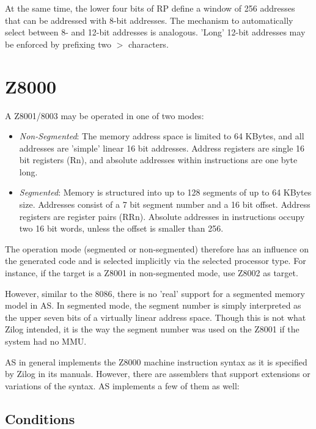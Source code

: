 \documentclass[12pt,twoside]{report}
\begin{document}
At the same time, the lower four bits of RP define a window of 256
addresses that can be addressed with 8-bit addresses.  The mechanism
to automatically select between 8- and 12-bit addresses is analogous.
'Long' 12-bit addresses may be enforced by prefixing two $>$
characters.


\section{Z8000}
\label{Z8000Spec}

A Z8001/8003 may be operated in one of two modes:

\begin{itemize}
\item{{\em Non-Segmented}: The memory address space is limited to 64 KBytes,
      and all addresses are 'simple' linear 16 bit addresses.  Address
      registers are single 16 bit registers (Rn), and absolute addresses
      within instructions are one byte long.}
\item{{\em Segmented}: Memory is structured into up to 128 segments of up
      to 64 KBytes size.  Addresses consist of a 7 bit segment number and a
      16 bit offset. Address registers are register pairs (RRn).  Absolute
      addresses in instructions occupy two 16 bit words, unless the offset
      is smaller than 256.}
\end{itemize}

The operation mode (segmented or non-segmented) therefore has an influence
on the generated code and is selected implicitly via the selected processor
type.  For instance, if the target is a Z8001 in non-segmented mode, use
Z8002 as target.

However, similar to the 8086, there is no 'real' support for a segmented
memory model in AS. In segmented mode, the segment number is simply interpreted
as the upper seven bits of a virtually linear address space.  Though this is
not what Zilog intended, it is the way the segment number was used on the
Z8001 if the system had no MMU.

AS in general implements the Z8000 machine instruction syntax as it is specified
by Zilog in its manuals.  However, there are assemblers that support extensions
or variations of the syntax.  AS implements a few of them as well:

\subsection{Conditions}
\end{document}
